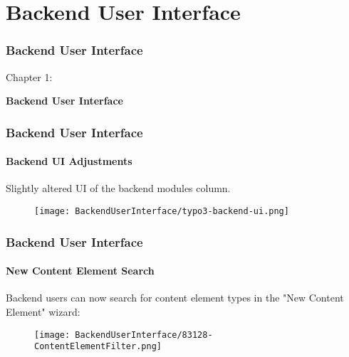 %

\section{Backend User Interface}
\begin{frame}[fragile]
	\frametitle{Backend User Interface}

	\begin{center}\huge{Chapter 1:}\end{center}
	\begin{center}\huge{\color{typo3darkgrey}\textbf{Backend User Interface}}\end{center}

\end{frame}


\begin{frame}[fragile]
	\frametitle{Backend User Interface}
	\framesubtitle{Backend UI Adjustments}

	Slightly altered UI of the backend modules column.

	\begin{figure}
		\texttt{[image: BackendUserInterface/typo3-backend-ui.png]}
	\end{figure}

\end{frame}


\begin{frame}[fragile]
	\frametitle{Backend User Interface}
	\framesubtitle{New Content Element Search}

	Backend users can now search for content element types in the "New Content Element" wizard:

	\begin{figure}
		\texttt{[image: BackendUserInterface/83128-ContentElementFilter.png]}
	\end{figure}

\end{frame}

